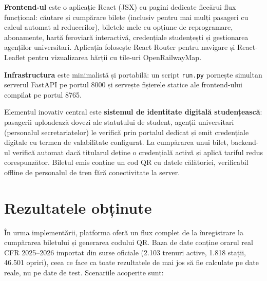 \documentclass[12pt,a4paper]{report}
\begin{document}
\textbf{Frontend-ul} este o aplicație React (JSX) cu pagini dedicate fiecărui flux funcțional: căutare și cumpărare bilete (inclusiv pentru mai mulți pasageri cu calcul automat al reducerilor), biletele mele cu opțiune de reprogramare, abonamente, hartă feroviară interactivă, credențiale studențești și gestionarea agenților universitari. Aplicația folosește React Router pentru navigare și React-Leaflet pentru vizualizarea hărții cu tile-uri OpenRailwayMap.

\textbf{Infrastructura} este minimalistă și portabilă: un script \texttt{run.py} pornește simultan serverul FastAPI pe portul 8000 și servește fișierele statice ale frontend-ului compilat pe portul 8765.

Elementul inovativ central este \textbf{sistemul de identitate digitală studențească}: pasagerii uploadează dovezi ale statutului de student, agenții universitari (personalul secretariatelor) le verifică prin portalul dedicat și emit credențiale digitale cu termen de valabilitate configurat. La cumpărarea unui bilet, backend-ul verifică automat dacă titularul deține o credențială activă și aplică tariful redus corespunzător. Biletul emis conține un cod QR cu datele călătoriei, verificabil offline de personalul de tren fără conectivitate la server.

\section{Rezultatele obținute}

În urma implementării, platforma oferă un flux complet de la înregistrare la cumpărarea biletului și generarea codului QR. Baza de date conține orarul real CFR 2025--2026 importat din surse oficiale (2.103 trenuri active, 1.818 stații, 46.501 opriri), ceea ce face ca toate rezultatele de mai jos să fie calculate pe date reale, nu pe date de test. Scenariile acoperite sunt:
\end{document}
